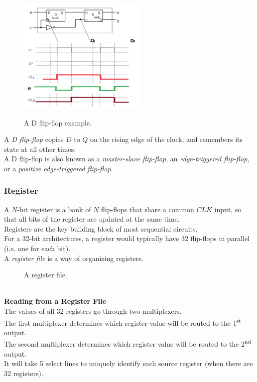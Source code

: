 \documentclass[12pt]{article}
\theoremstyle{definition}
\newcommand{\includePicture}[3]{
  \begin{figure}[!ht]
  \centering
  \scalebox{#1}{\texttt{[image: \#2]}}
  \caption{#3}
  \end{figure}
}
\begin{document}
  \begin{figure}[!ht]
  \centering
  \includegraphics[width=0.55\textwidth]{pictures/dFlipFlopExample.png} \\
  \caption{A D flip-flop example.}
  \end{figure}
  A \emph{D flip-flop} copies $D$ to $Q$ on the rising edge of the clock, and remembers its state at all other times. \\

  A D flip-flop is also known as a \emph{master-slave flip-flop}, an \emph{edge-triggered flip-flop}, or a \emph{positive edge-triggered flip-flop}.

  \subsubsection{Register}
  A $N$-bit register is a bank of $N$ flip-flops that share a common $CLK$ input, so that all bits of the register are updated at the same time. \\
  Registers are the key building block of most sequential circuits. \\

  For a 32-bit architectures, a register would typically have 32 flip-flops in parallel (i.e. one for each bit). \\
  A \emph{register file} is a way of organizing registers. \\
  \includePicture{1.0}{pictures/registerFile.png}{A register file.} \label{registerFile} \\

  \textbf{Reading from a Register File} \\
  The values of all 32 registers go through two multiplexers. \\
  The first multiplexer determines which register value will be routed to the 1\textsuperscript{st} output. \\
  The second multiplexer determines which register value will be routed to the 2\textsuperscript{nd} output. \\
  It will take 5 select lines to uniquely identify each source register (when there are 32 registers).
\end{document}
